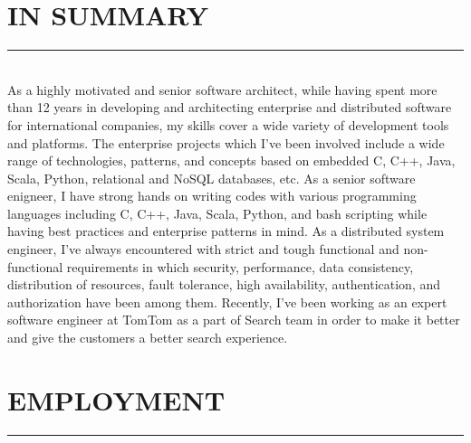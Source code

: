 \documentclass[10pt,a4paper]{article}
\begin{document}
\thispagestyle{fancy}

\hfill \break
\section{IN SUMMARY}
\noindent \rule {3.4cm}{0.4pt} \\
As a highly motivated and senior software architect, while having spent more than 12 years in developing and architecting enterprise and distributed software for international companies, my skills cover a wide variety of development tools and platforms. The enterprise projects which I've been involved include a wide range of technologies, patterns, and concepts based on embedded C, C++, Java, Scala, Python, relational and NoSQL databases, etc. As a senior software enigneer, I have strong hands on writing codes with various programming languages including C, C++, Java, Scala, Python, and bash scripting while having best practices and enterprise patterns in mind. As a distributed system engineer, I've always encountered with strict and tough functional and non-functional requirements in which security, performance, data consistency, distribution of resources, fault tolerance, high availability, authentication, and authorization have been among them. Recently, I've been working as an expert software engineer at TomTom as a part of Search team in order to make it better and give the customers a better search experience.

\section{EMPLOYMENT}
\noindent \rule {3.7cm}{0.4pt}
  
\end{document}
